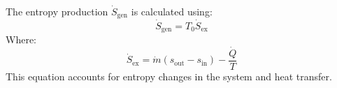 The entropy production \( \dot{S}_{\text{gen}} \) is calculated using:  
\[
\dot{S}_{\text{gen}} = T_0 \dot{S}_{\text{ex}}
\]  
Where:  
\[
\dot{S}_{\text{ex}} = \dot{m} \left( s_{\text{out}} - s_{\text{in}} \right) - \frac{\dot{Q}}{T}
\]  
This equation accounts for entropy changes in the system and heat transfer.